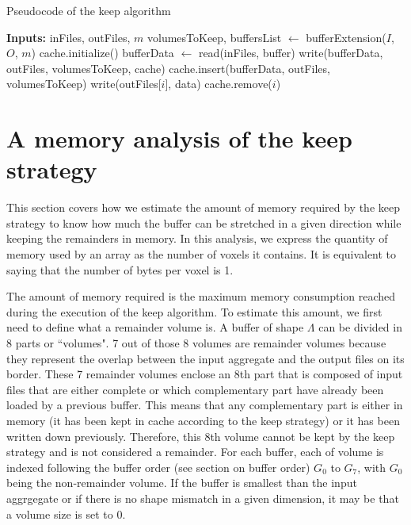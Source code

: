 \documentclass[conference]{IEEEtran}
\begin{document}
\begin{algorithm}
  \caption{Pseudocode of the keep algorithm}
  \label{algo:keepalgorithm}
  \begin{algorithmic}
    \STATE \textbf{Inputs:} inFiles, outFiles, $m$
    \STATE volumesToKeep, buffersList $\leftarrow$ bufferExtension($I$, $O$, $m$)
    \STATE cache.initialize()
      \STATE bufferData $\leftarrow$ read(inFiles, buffer)
      \STATE write(bufferData, outFiles, volumesToKeep, cache)
      \STATE cache.insert(bufferData, outFiles, volumesToKeep)
          \STATE write(outFiles[$i$], data)
          \STATE cache.remove($i$)
        \ENDIF
      \ENDFOR
    \ENDFOR

  \end{algorithmic}
\end{algorithm}

\section{A memory analysis of the keep strategy}
This section covers how we estimate the amount of memory required by the keep
strategy to know how much the buffer can be stretched in a given direction while
keeping the remainders in memory. In this analysis, we express the quantity of
memory used by an array as the number of voxels it contains. It is equivalent
to saying that the number of bytes per voxel is 1.

The amount of memory required is the maximum memory consumption reached during
the execution of the keep algorithm. To estimate this amount, we first need to
define what a remainder volume is. A buffer of shape $\Lambda$ can be divided in
8 parts or ``volumes". 7 out of those 8 volumes are remainder volumes because
they represent the overlap between the input aggregate and the output files on
its border. These 7 remainder volumes enclose an 8th part that is composed of
input files that are either complete or which complementary part have already
been loaded by a previous buffer. This means that any complementary part is either
in memory (it has been kept in cache according to the keep strategy) or it has
been written down previously. Therefore, this 8th volume cannot be kept by the
keep strategy and is not considered a remainder. For each buffer, each of volume
is indexed following the buffer order (see section on buffer order) $G_0$ to $G_7$, with
$G_0$ being the non-remainder volume. If the buffer is smallest than the input
aggrgegate or if there is no shape mismatch in a given dimension, it may be that
a volume size is set to 0.
\end{document}
